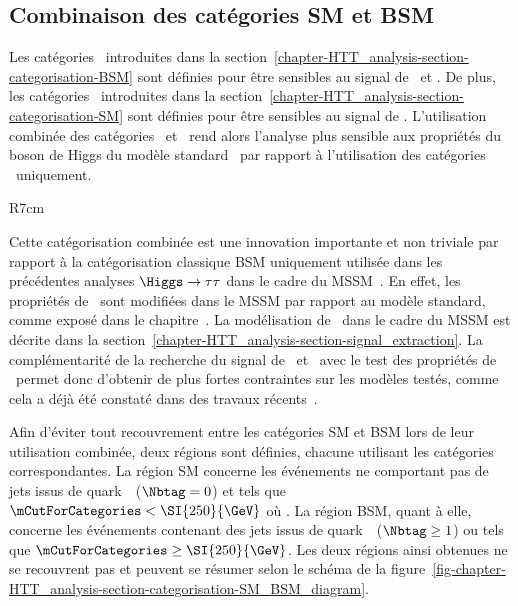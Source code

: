 \subsection{Combinaison des catégories SM et BSM}\label{chapter-HTT_analysis-section-categorisation-SM_and_BSM}
Les catégories \CATbsm\ introduites dans la section~\ref{chapter-HTT_analysis-section-categorisation-BSM} sont définies pour être sensibles au signal de \Higgs\ et \HiggsA.
De plus, les catégories \CATsm\ introduites dans la section~\ref{chapter-HTT_analysis-section-categorisation-SM} sont définies pour être sensibles au signal de \higgs.
L'utilisation combinée des catégories \CATsm\ et \CATbsm\ rend alors l'analyse plus sensible aux propriétés du boson de Higgs du modèle standard \higgs\ par rapport à l'utilisation des catégories \CATbsm\ uniquement.
\begin{wrapfigure}{R}{7cm}
\centering

\caption{Définition des deux régions utilisant des catégories différentes.}
\label{fig-chapter-HTT_analysis-section-categorisation-SM_BSM_diagram}
\end{wrapfigure}
\par
Cette catégorisation combinée est une innovation importante et non triviale par rapport à la catégorisation classique \og BSM uniquement \fg{} utilisée dans les précédentes analyses $\Higgs\to\tau\tau$ dans le cadre du MSSM~\cite{CMS-PAS-HIG-13-021,CMS-PAS-HIG-14-029,CMS-PAS-HIG-17-020}.
En effet, les propriétés de \higgs\ sont modifiées dans le MSSM par rapport au modèle standard, comme exposé dans le chapitre~.
La modélisation de \higgs\ dans le cadre du MSSM est décrite dans la section~\ref{chapter-HTT_analysis-section-signal_extraction}.
La complémentarité de la recherche du signal de \Higgs\ et \HiggsA\ avec le test des propriétés de \higgs\ permet donc d'obtenir de plus fortes contraintes sur les modèles testés, comme cela a déjà été constaté dans des travaux récents~\cite{Artur_thesis}.
\par
Afin d'éviter tout recouvrement entre les catégories SM et BSM lors de leur utilisation combinée, deux régions sont définies, chacune utilisant les catégories correspondantes.
La région SM concerne les événements ne comportant pas de jets issus de quark~\quarkb\ ($\Nbtag=0$) et tels que $\mCutForCategories < \SI{250}{\GeV}$ où
\mCutForCategoriesdef.
La région BSM, quant à elle, concerne les événements contenant des jets issus de quark~\quarkb\ ($\Nbtag\geq1$) ou tels que $\mCutForCategories \geq \SI{250}{\GeV}$.
Les deux régions ainsi obtenues ne se recouvrent pas et peuvent se résumer selon le schéma de la figure~\ref{fig-chapter-HTT_analysis-section-categorisation-SM_BSM_diagram}.